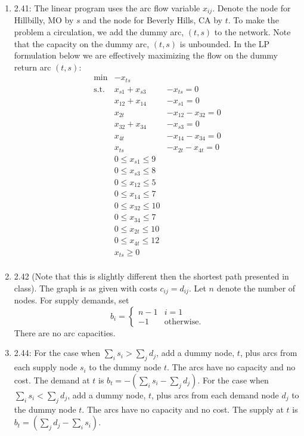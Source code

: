 \documentclass[10pt]{article}
\begin{document}
\begin{enumerate}
  \item 2.41: The linear program uses the arc flow variable $x_{ij}$.
    Denote the node for Hillbilly, MO by $s$ and the node for Beverly
    Hills, CA by $t$. To make the problem a circulation, we add the
    dummy arc, $(t,s)$ to the network. Note that the capacity on the dummy arc, $(t,s)$ is unbounded.  In the LP formulation below we are effectively maximizing the flow    on the dummy return arc $(t,s)$:
    \[
    \begin{array}{lll}
      \min & -x_{ts} &  \\
      \mbox{s.t.} & x_{s1} + x_{s3} & - x_{ts} = 0  \\
      & x_{12} + x_{14} & - x_{s1} = 0 \\
      & x_{2t} & - x_{12} - x_{32} = 0 \\
      & x_{32} + x_{34} & - x_{s3} = 0 \\
      & x_{4t} & - x_{14} - x_{34} = 0 \\
      & x_{ts} & - x_{2t} - x_{4t} = 0 \\
      & 0 \leq x_{s1} \leq 9& \\
      & 0 \leq x_{s3} \leq 8& \\
      & 0 \leq x_{12} \leq 5& \\
      & 0 \leq x_{14} \leq 7& \\
      & 0 \leq x_{32} \leq 10& \\
      & 0 \leq x_{34} \leq 7& \\
      & 0 \leq x_{2t} \leq 10& \\
      & 0 \leq x_{4t} \leq 12& \\
      & x_{ts} \geq 0& \\
    \end{array}
    \]
  \item 2.42 (Note that this is slightly different then the shortest
    path presented in class). The graph is as given with costs $c_{ij}
    = d_{ij}$. Let $n$ denote the number of nodes. For supply demands, set
    \[
    b_i = \left\{
      \begin{array}{ll}
        n-1 & i = 1 \\
        -1 & \mbox{otherwise}.
      \end{array}
    \right.
    \]
    There are no arc capacities.
  \item 2.44: For the case when $\sum_i s_i > \sum_j d_j$, add a dummy node, $t$,
    plus arcs from each supply node $s_i$ to the dummy node $t$. The
    arcs have no capacity and no cost. The demand at $t$ is $b_t =
    -(\sum_i s_i - \sum_j d_j)$.  For the case when $\sum_i s_i < \sum_j d_j$, add a dummy node, $t$, plus arcs from each demand node $d_j$ to the dummy node $t$.  The arcs have no capacity and no cost.  The supply at $t$ is $b_t = (\sum_j d_j - \sum_i s_i)$.


\end{enumerate}
\end{document}
